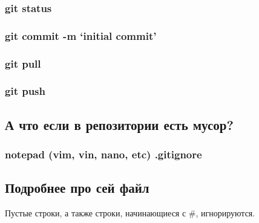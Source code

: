\documentclass[11pt]{article}
\begin{document}
\hypertarget{git-status}{%
\subsubsection{git status}\label{git-status}}

\hypertarget{git-commit--m-initial-commit}{%
\subsubsection{git commit -m `initial
commit'}\label{git-commit--m-initial-commit}}

\hypertarget{git-pull}{%
\subsubsection{git pull}\label{git-pull}}

\hypertarget{git-push}{%
\subsubsection{git push}\label{git-push}}

    \hypertarget{ux430-ux447ux442ux43e-ux435ux441ux43bux438-ux432-ux440ux435ux43fux43eux437ux438ux442ux43eux440ux438ux438-ux435ux441ux442ux44c-ux43cux443ux441ux43eux440}{%
\subsection{А что если в репозитории есть
мусор?}\label{ux430-ux447ux442ux43e-ux435ux441ux43bux438-ux432-ux440ux435ux43fux43eux437ux438ux442ux43eux440ux438ux438-ux435ux441ux442ux44c-ux43cux443ux441ux43eux440}}

\hypertarget{notepad-vim-vin-nano-etc-.gitignore}{%
\subsubsection{notepad (vim, vin, nano, etc)
.gitignore}\label{notepad-vim-vin-nano-etc-.gitignore}}

    \hypertarget{ux43fux43eux434ux440ux43eux431ux43dux435ux435-ux43fux440ux43e-ux441ux435ux439-ux444ux430ux439ux43b}{%
\subsection{Подробнее про сей
файл}\label{ux43fux43eux434ux440ux43eux431ux43dux435ux435-ux43fux440ux43e-ux441ux435ux439-ux444ux430ux439ux43b}}

Пустые строки, а также строки, начинающиеся с \#, игнорируются.
\end{document}
